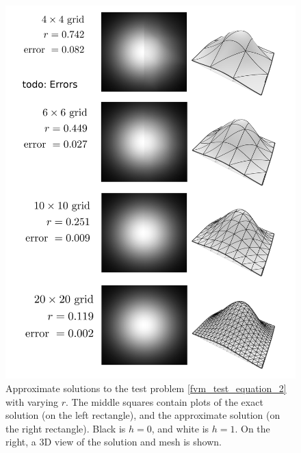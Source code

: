 \begin{figure}[H]
    \begin{center}
        \includegraphics[width=1\linewidth]{figures/quadratic_error/quadratic_error.png}
    \end{center}
    \caption{
        Approximate solutions to the test problem \eqref{fvm_test_equation_2} with varying $r$.
        The middle squares contain plots of the exact solution (on the left rectangle), and the approximate solution (on the right rectangle).
        Black is $h = 0$, and white is $h = 1$.
        On the right, a 3D view of the solution and mesh is shown.
    }
    \label{quadratic_fem_error_page}
\end{figure}

